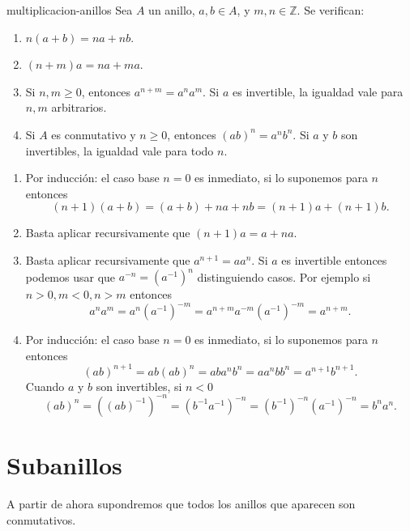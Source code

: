\begin{lemma}{}{multiplicacion-anillos}
    Sea \( A \) un anillo, \( a, b \in A \), y \( m, n \in \mathbb{Z} \). Se verifican:
    \begin{enumerate}
        \item \( n (a + b) = n a + n b \).
        \item \( (n + m) a = n a + m a \).
        \item Si \( n, m \geq 0 \), entonces \( a^{n + m} = a^n a^m \). Si \( a \) es invertible, la igualdad vale para \( n, m \) arbitrarios.
        \item Si \( A \) es conmutativo y \( n \geq 0 \), entonces \( (a b)^n = a^n b^n \). Si \( a \) y \( b \) son invertibles, la igualdad vale para todo \( n \).
    \end{enumerate}
\end{lemma}

\begin{proofbox}
    \begin{enumerate}
        \item Por inducción: el caso base $n=0$ es inmediato, si lo suponemos para $n$ entonces
        \[
        (n+1) (a + b) = (a+b)+ n a + n b = (n+1) a + (n+1) b.
        \]
        \item Basta aplicar recursivamente que $(n+1)a = a + na$.
        \item Basta aplicar recursivamente que $a^{n+1} = a a^n$. Si $a$ es invertible entonces podemos usar que $a^{-n}=(a^{-1})^n$ distinguiendo casos. Por ejemplo si $n>0,m<0, n>m$ entonces
        \[
        a^{n}a^{m}=a^n(a^{-1})^{-m}=a^{n+m}a^{-m}(a^{-1})^{-m}=a^{n+m}.
        \]
        \item Por inducción: el caso base $n=0$ es inmediato, si lo suponemos para $n$ entonces
        \[
        (ab)^{n+1}=ab(ab)^n=aba^nb^n=aa^nbb^n=a^{n+1}b^{n+1}.
        \]
        Cuando \( a \) y \( b \) son invertibles, si $n<0$
        \[
        (ab)^n=((ab)^{-1})^{-n}=(b^{-1}a^{-1})^{-n}=(b^{-1})^{-n}(a^{-1})^{-n}=b^n a^n.
        \]
    \end{enumerate}
\end{proofbox}

\clearpage
\section{Subanillos}

\begin{remark}
    A partir de ahora supondremos que todos los anillos que aparecen son conmutativos.
\end{remark}

